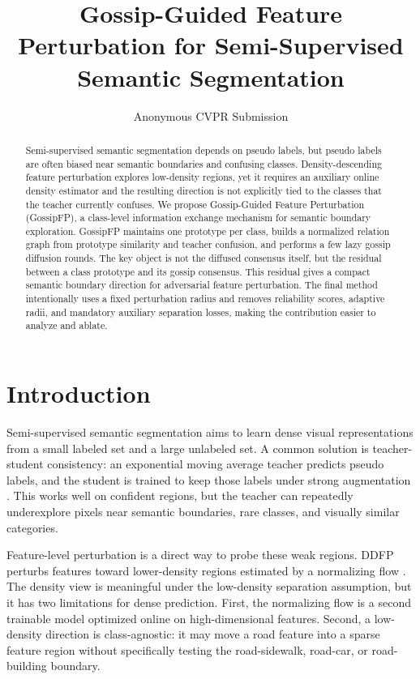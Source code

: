 \documentclass[10pt,twocolumn,letterpaper]{article}
\title{Gossip-Guided Feature Perturbation for Semi-Supervised Semantic Segmentation}
\author{Anonymous CVPR Submission}
\begin{document}
\maketitle

\begin{abstract}
Semi-supervised semantic segmentation depends on pseudo labels, but pseudo labels are often biased near semantic boundaries and confusing classes. Density-descending feature perturbation explores low-density regions, yet it requires an auxiliary online density estimator and the resulting direction is not explicitly tied to the classes that the teacher currently confuses. We propose Gossip-Guided Feature Perturbation (GossipFP), a class-level information exchange mechanism for semantic boundary exploration. GossipFP maintains one prototype per class, builds a normalized relation graph from prototype similarity and teacher confusion, and performs a few lazy gossip diffusion rounds. The key object is not the diffused consensus itself, but the residual between a class prototype and its gossip consensus. This residual gives a compact semantic boundary direction for adversarial feature perturbation. The final method intentionally uses a fixed perturbation radius and removes reliability scores, adaptive radii, and mandatory auxiliary separation losses, making the contribution easier to analyze and ablate.
\end{abstract}

\section{Introduction}

Semi-supervised semantic segmentation aims to learn dense visual representations from a small labeled set and a large unlabeled set. A common solution is teacher-student consistency: an exponential moving average teacher predicts pseudo labels, and the student is trained to keep those labels under strong augmentation \cite{tarvainen2017mean}. This works well on confident regions, but the teacher can repeatedly underexplore pixels near semantic boundaries, rare classes, and visually similar categories.

Feature-level perturbation is a direct way to probe these weak regions. DDFP perturbs features toward lower-density regions estimated by a normalizing flow \cite{wang2024ddfp}. The density view is meaningful under the low-density separation assumption, but it has two limitations for dense prediction. First, the normalizing flow is a second trainable model optimized online on high-dimensional features. Second, a low-density direction is class-agnostic: it may move a road feature into a sparse feature region without specifically testing the road-sidewalk, road-car, or road-building boundary.
\end{document}
